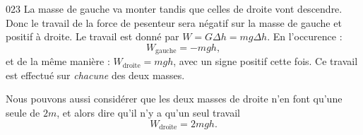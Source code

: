 \begin{corrige}{023}
La masse  de gauche va monter tandis que celles de droite vont descendre. Donc le travail de la force de pesenteur sera négatif sur la masse de gauche et positif à droite. Le travail est donné par $W=G\Delta h=mg\Delta h$. En l'occurence :
\[ 
 W_{\text{gauche}}=-mgh,
\]
et de la même manière : $W_{\text{droite}}=mgh$, avec un signe positif cette fois. Ce travail est effectué sur \emph{chacune} des deux masses. 

Nous pouvons aussi considérer que les deux masses de droite n'en font qu'une seule de $2m$, et alors dire qu'il n'y a qu'un seul travail 
\[
W_{\text{droite}}=2mgh.
\]
\end{corrige}
